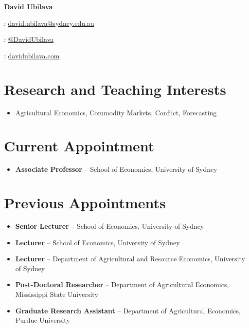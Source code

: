 \documentclass[10pt]{article}
\begin{document}
	
	
	
	\hspace{0.00in}\Large{\bfseries{David Ubilava \faGraduationCap}}
	\normalsize
	
	\medskip
	
	{\faEnvelope: \href{mailto:david.ubilava@sydney.edu.au}{david.ubilava@sydney.edu.au}}
	
	\smallskip
	
	{\faTwitter: \href{https://twitter.com/DavidUbilava}{@DavidUbilava}}
	
	\smallskip
	
	{\faGlobe: \href{https://davidubilava.com}{davidubilava.com}}
	
%	

	\medskip

	
	\section*{Research and Teaching Interests}
	\begin{itemize}
		\item Agricultural Economics, Commodity Markets, Conflict, Forecasting
	\end{itemize}
	
	\section*{Current Appointment}
	\begin{itemize}
		\item {} \textbf{Associate Professor} -- School of Economics, University of Sydney
	\end{itemize}
	
	\section*{Previous Appointments}
	\begin{itemize}
	\item {} \textbf{Senior Lecturer} -- School of Economics, University of Sydney
	\item {} \textbf{Lecturer} -- School of Economics, University of Sydney
	\item {} \textbf{Lecturer} -- Department of Agricultural and Resource Economics, University of Sydney
	\item {} \textbf{Post-Doctoral Researcher} -- Department of Agricultural Economics, Mississippi State University
	\item {} \textbf{Graduate Research Assistant} -- Department of Agricultural Economics, Purdue University
	\end{itemize}
	
\end{document}
